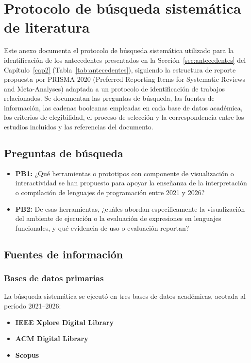 \chapter{Protocolo de búsqueda sistemática de literatura}
\label{annex:slr}

Este anexo documenta el protocolo de búsqueda sistemática utilizado para la identificación de los antecedentes presentados en la Sección~\ref{sec:antecedentes} del Capítulo~\ref{cap2} (Tabla~\ref{tab:antecedentes}), siguiendo la estructura de reporte propuesta por PRISMA 2020 (Preferred Reporting Items for Systematic Reviews and Meta-Analyses) adaptada a un protocolo de identificación de trabajos relacionados. Se documentan las preguntas de búsqueda, las fuentes de información, las cadenas booleanas empleadas en cada base de datos académica, los criterios de elegibilidad, el proceso de selección y la correspondencia entre los estudios incluidos y las referencias del documento.

\section{Preguntas de búsqueda}

\begin{itemize}
    \item \textbf{PB1:} ¿Qué herramientas o prototipos con componente de visualización o interactividad se han propuesto para apoyar la enseñanza de la interpretación o compilación de lenguajes de programación entre 2021 y 2026?
    \item \textbf{PB2:} De esas herramientas, ¿cuáles abordan específicamente la visualización del ambiente de ejecución o la evaluación de expresiones en lenguajes funcionales, y qué evidencia de uso o evaluación reportan?
\end{itemize}

\section{Fuentes de información}

\subsection{Bases de datos primarias}

La búsqueda sistemática se ejecutó en tres bases de datos académicas, acotada al período 2021--2026:

\begin{itemize}
    \item \textbf{IEEE Xplore Digital Library}
    \item \textbf{ACM Digital Library}
    \item \textbf{Scopus}
\end{itemize}

